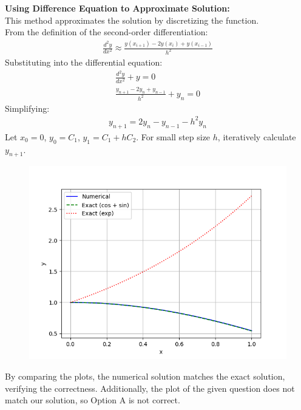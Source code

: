 \documentclass[journal]{IEEEtran}
\begin{document}
\textbf{Using Difference Equation to Approximate Solution:}\\
This method approximates the solution by discretizing the function.\\
From the definition of the second-order differentiation:
\begin{align}
	\frac{d^2y}{dx^2} \approx \frac{y(x_{i+1}) - 2y(x_i) + y(x_{i-1})}{h^2}
\end{align}
Substituting into the differential equation:
\begin{align}
	\frac{d^2y}{dx^2} + y = 0 \\
	\frac{y_{n+1} - 2y_n + y_{n-1}}{h^2} + y_n = 0
\end{align}
Simplifying:
\begin{align}
	y_{n+1} = 2y_n - y_{n-1} - h^2y_n
\end{align}
Let \( x_0 = 0 \), \( y_0 = C_1 \), \( y_1 = C_1 + hC_2 \). For small step size \( h \), iteratively calculate \( y_{n+1} \).\\

\begin{figure}[h]
	\centering
	\includegraphics[width=\textwidth]{figs/fig.png}
\end{figure}

By comparing the plots, the numerical solution matches the exact solution, verifying the correctness. Additionally, the plot of the given question does not match our solution, so Option A is not correct.
\end{document}
